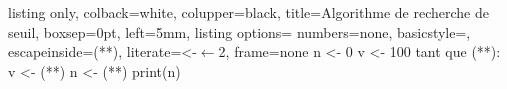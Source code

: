 \begin{enumerate}[series=monDS, resume]
\begin{minipage}{0.45\textwidth}
    \end{minipage}\hfill{}
    \begin{minipage}{0.46\textwidth}
    \begin{tcblisting}{%
  listing only,
  colback=white, 
  colupper=black, 
  title=Algorithme de recherche de seuil,
  boxsep=0pt,
  left=5mm,
  listing options={
    numbers=none,
    basicstyle=\ttfamily,
    escapeinside={(*}{*)},
    literate={<-}{{$\bm{\leftarrow}$}}2, %
    frame=none %
    }
}
n <- 0
v <- 100
tant que (**):
        v <- (**)
        n <- (**)
print(n)
\end{tcblisting}
    \end{minipage}
    \medskip

    \end{enumerate}

\bigskip



